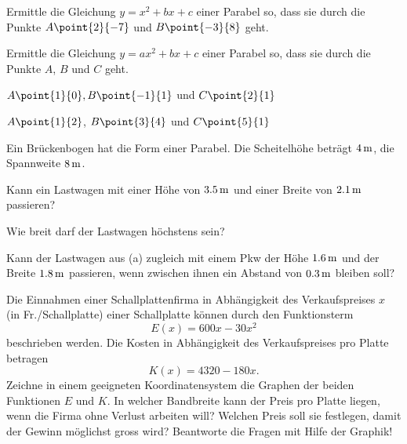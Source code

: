 \documentclass[%
11pt,%
twoside,%
titlepage,%
german,%
headsepline%
]{scrartcl}
\begin{document}
\begin{ueb}
Ermittle die Gleichung $y=x^2+bx+c$ einer Parabel so, dass sie durch die Punkte $A\point{2}{-7}$ und $B\point{-3}{8}$ geht.
\end{ueb}

\begin{ueb}
Ermittle
die Gleichung $y=ax^2+bx+c$ einer Parabel so, dass sie durch die Punkte $A$, $B$ und $C$ geht.
\begin{enumeratea}
\item $A\point{1}{0}, B\point{-1}{1}$ und $C\point{2}{1}$
\item $A\point{1}{2}$, $B\point{3}{4}$ und $C\point{5}{1}$
\end{enumeratea}
\end{ueb}

\pagebreak

\begin{ueb}[Lastwagen]
Ein
Br\"uckenbogen hat die Form einer Parabel. Die Scheitelh\"ohe betr\"agt $\unit[4]{m}$, die Spannweite $\unit[8]{m}$.
\begin{enumeratea}
\item Kann ein Lastwagen mit einer H\"ohe von $\unit[3.5]{m}$ und
einer Breite von $\unit[2.1]{m}$ passieren?
\item Wie breit darf der Lastwagen h\"ochstens sein?
\item Kann der Lastwagen aus (a) zugleich mit einem
Pkw der H\"ohe $\unit[1.6]{m}$ und der Breite $\unit[1.8]{m}$ passieren, wenn zwischen ihnen ein Abstand von $\unit[0.3]{m}$ bleiben soll?
\end{enumeratea}
\end{ueb}

\begin{ueb}[Vinyl]
Die Einnahmen einer Schallplattenfirma in Abh\"angigkeit des Verkaufspreises $x$ (in Fr./Schallplatte) einer Schallplatte k\"onnen durch den Funktionsterm
$$E(x) =600x - 30x^2$$
beschrieben werden. Die Kosten in Abh\"angigkeit des Verkaufspreises pro Platte betragen 
$$K(x) =4320 - 180x.$$
Zeichne in einem geeigneten Koordinatensystem die Graphen der beiden Funktionen $E$ und $K$. In welcher Bandbreite kann der Preis pro Platte liegen, wenn die Firma ohne Verlust arbeiten will? Welchen Preis soll sie festlegen, damit der Gewinn m\"oglichst gross wird? Beantworte die Fragen mit Hilfe der Graphik!
\end{ueb}
\end{document}
